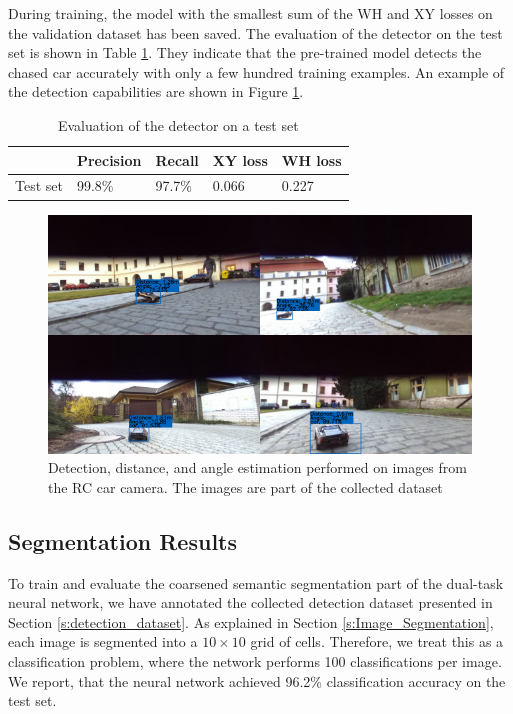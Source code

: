 \documentclass{ctuthesis/ctuthesis}
\begin{document}
During training, the model with the smallest sum of the WH and XY losses on the validation dataset has been saved. The evaluation of the detector on the test set is shown in Table \ref{tab:detection}. They indicate that the pre-trained model detects the chased car accurately with only a few hundred training examples. An example of the detection capabilities are shown in Figure \ref{f:detection_images}. 

\begin{table}[]
\begin{tabular}{l|llll}
\hline
            & Precision & Recall & XY loss & WH loss \\ \hline
Test set & 99.8\%    & 97.7\% & 0.066   & 0.227   \\ \hline
\end{tabular}
\caption{Evaluation of the detector on a test set}\label{tab:detection}
\end{table}



\begin{figure}[]
    \centering
    \includegraphics[width=1\textwidth]{images/detection_collage.pdf}
    
    \caption{Detection, distance, and angle estimation performed on images from the RC car camera. The images are part of the collected dataset}\label{f:detection_images}
\end{figure}



\subsection{Segmentation Results}
To train and evaluate the coarsened semantic segmentation part of the dual-task neural network, we have annotated the collected detection dataset presented in Section \ref{s:detection_dataset}. As explained in Section \ref{s:Image_Segmentation}, each image is segmented into a $10\times 10$ grid of cells. Therefore, we treat this as a classification problem, where the network performs 100 classifications per image. We report, that the neural network achieved 96.2\% classification accuracy on the test set.
\end{document}
